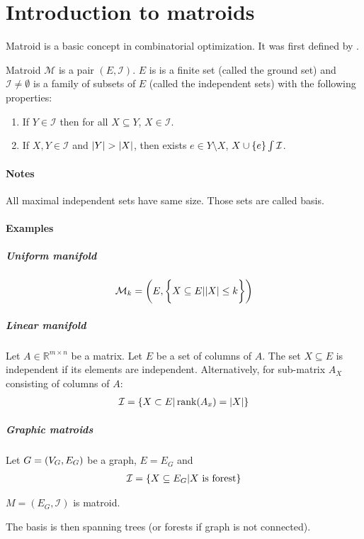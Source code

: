 \section{Introduction to matroids}
Matroid is a basic concept in combinatorial optimization. It was first defined by \citet{whitney1935abstract}. 
\begin{definition}[matroid]
	Matroid $\mathcal{M}$ is a pair $(E,\mathcal{I})$. $E$ is is a finite set (called the ground set) and $\mathcal{I}\neq \emptyset$ is a family of subsets of $E$ (called the independent sets) with the following properties:
	\begin{enumerate}
		\item If $Y\in \mathcal{I}$ then for all $X\subseteq Y$, $X\in \mathcal{I}$.
		\item If $X,Y\in \mathcal{I}$ and $\abs{Y}>\abs{X}$, then exists $e\in Y\setminus X$, $X\cup \qty{e} \int \mathcal{I}$.
	\end{enumerate}
\end{definition}

\paragraph{Notes} All maximal independent sets have same size. Those sets are called basis.


\paragraph{Examples}
\subparagraph{Uniform manifold} 
\begin{align}
	\mathcal{M}_{k} = \qty(E, \qty\bigg{X\subseteq E | \abs{X} \leq k})
\end{align}
\subparagraph{Linear manifold} 
Let $A\in \mathbb{R}^{m\times n}$ be a matrix. Let $E$ be a set of columns of $A$. The set $X\subseteq E$ is independent if its elements are independent. Alternatively, for sub-matrix $A_X$ consisting of columns of $A$:
\begin{align}
\mathcal{I} = \qty{ X\subset E | \rank(A_x) = \abs{X}}
\end{align}


\subparagraph{Graphic matroids} 
Let $G=\qty(V_G,E_G)$ be a graph, $E=E_G$ and
\begin{align}
\mathcal{I} = \qty{X\subseteq E_G | X \text{ is forest}}
\end{align}
\begin{prop}
	$M=(E_G,\mathcal{I})$ is matroid.
\end{prop}
The basis is then spanning trees (or forests if graph is not connected).

